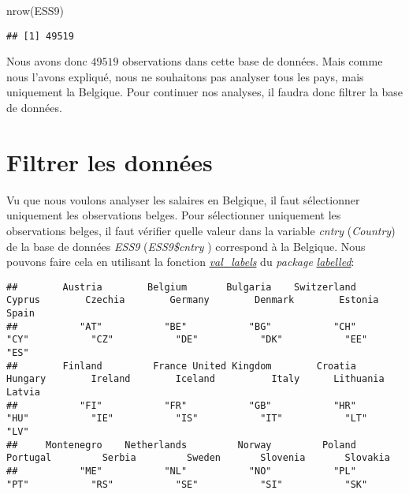 \documentclass[
]{book}
\newenvironment{Shaded}{\begin{snugshade}}{\end{snugshade}}
\newcommand{\FunctionTok}[1]{\textcolor[rgb]{0.00,0.00,0.00}{#1}}
\newcommand{\NormalTok}[1]{#1}
\newcommand{\SpecialCharTok}[1]{\textcolor[rgb]{0.00,0.00,0.00}{#1}}
\begin{document}
\begin{Shaded}
\begin{Highlighting}[]
\FunctionTok{nrow}\NormalTok{(ESS9)}
\end{Highlighting}
\end{Shaded}

\begin{verbatim}
## [1] 49519
\end{verbatim}

Nous avons donc \(49519\) observations dans cette base de données. Mais comme nous l'avons expliqué, nous ne souhaitons pas analyser tous les pays, mais uniquement la Belgique. Pour continuer nos analyses, il faudra donc filtrer la base de données.

\hypertarget{filtrer-les-donnuxe9es}{%
\section{Filtrer les données}\label{filtrer-les-donnuxe9es}}

Vu que nous voulons analyser les salaires en Belgique, il faut sélectionner uniquement les observations belges. Pour sélectionner uniquement les observations belges, il faut vérifier quelle valeur dans la variable \emph{cntry} (\emph{Country}) de la base de données \emph{ESS9} (\emph{ESS9\$cntry} ) correspond à la Belgique. Nous pouvons faire cela en utilisant la fonction \href{https://www.rdocumentation.org/packages/labelled/versions/2.10.0/topics/val_labels}{\emph{val\_labels}} du \emph{package} \href{https://cran.r-project.org/web/packages/labelled/vignettes/intro_labelled.html}{\emph{labelled}}:

\begin{Shaded}
\end{Shaded}

\begin{verbatim}
##        Austria        Belgium       Bulgaria    Switzerland         Cyprus        Czechia        Germany        Denmark        Estonia          Spain 
##           "AT"           "BE"           "BG"           "CH"           "CY"           "CZ"           "DE"           "DK"           "EE"           "ES" 
##        Finland         France United Kingdom        Croatia        Hungary        Ireland        Iceland          Italy      Lithuania         Latvia 
##           "FI"           "FR"           "GB"           "HR"           "HU"           "IE"           "IS"           "IT"           "LT"           "LV" 
##     Montenegro    Netherlands         Norway         Poland       Portugal         Serbia         Sweden       Slovenia       Slovakia 
##           "ME"           "NL"           "NO"           "PL"           "PT"           "RS"           "SE"           "SI"           "SK"
\end{verbatim}
\end{document}
